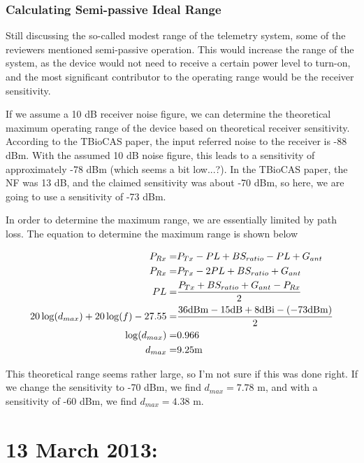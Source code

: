 \documentclass[12pt,onecolumn,titlepage]{article}
\begin{document}
\subsubsection{Calculating Semi-passive Ideal Range}
\indent \indent Still discussing the so-called modest range of the telemetry system, some of the reviewers mentioned semi-passive operation. This would increase the range of the system, as the device would not need to receive a certain power level to turn-on, and the most significant contributor to the operating range would be the receiver sensitivity. 

If we assume a 10 dB receiver noise figure, we can determine the theoretical maximum operating range of the device based on theoretical receiver sensitivity. According to the TBioCAS paper, the input referred noise to the receiver is -88 dBm. With the assumed 10 dB noise figure, this leads to a sensitivity of approximately -78 dBm (which seems a bit low...?). In the TBioCAS paper, the NF was 13 dB, and the claimed sensitivity was about -70 dBm, so here, we are going to use a sensitivity of -73 dBm.

In order to determine the maximum range, we are essentially limited by path loss. The equation to determine the maximum range is shown below

\begin{eqnarray}
P_{Rx} =& P_{Tx} - PL + BS_{ratio} - PL + G_{ant} \\
P_{Rx} = & P_{Tx} - 2PL + BS_{ratio} + G_{ant} \\
PL =& \frac{P_{Tx}+BS_{ratio}+G_{ant}-P_{Rx}}{2} \\
20\log(d_{max})+20\log(f)-27.55 =& \frac{36 {\rm{dBm}} - 15 {\rm{dB}} + 8 {\rm{dBi}} - (-73 {\rm{dBm}})}{2} \\ 
\log(d_{max}) =& 0.966 \\
d_{max} =& 9.25 {\rm{m}}
\end{eqnarray}

This theoretical range seems rather large, so I'm not sure if this was done right. If we change the sensitivity to -70 dBm, we find $d_{max} = 7.78$ m, and with a sensitivity of -60 dBm, we find $d_{max}=4.38$ m.


\clearpage
\section{13 March 2013:}
\end{document}
